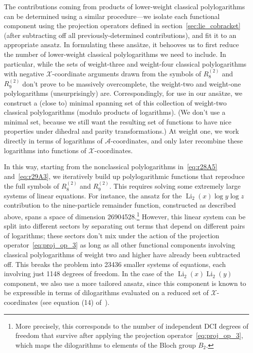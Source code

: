 \documentclass[11pt]{article}
\DeclareMathOperator{\Li}{Li}
\def\x{\mathcal{X}}
\def\a{\mathcal{A}}
\begin{document}
The contributions coming from products of lower-weight classical polylogarithms can be determined using a similar procedure---we isolate each functional component using the projection operators defined in section~\ref{sec:lie_cobracket} (after subtracting off all previously-determined contributions), and fit it to an appropriate ansatz. In formulating these ans\"atze, it behooves us to first reduce the number of lower-weight classical polylogarithms we need to include. In particular, while the sets of weight-three and weight-four classical polylogarithms with negative $\x$-coordinate arguments drawn from the symbols of $R_8^{(2)}$\! and $R_9^{(2)}$\! don't prove to be massively overcomplete, the weight-two and weight-one polylogarithms (unsurprisingly) are. Correspondingly, for use in our ans\"atze, we construct a (close to) minimal spanning set of this collection of weight-two classical polylogarithms (modulo products of logarithms). (We don't use a minimal set, because we still want the resulting set of functions to have nice properties under dihedral and parity transformations.) At weight one, we work directly in terms of logarithms of $\a$-coordinates, and only later recombine these logarithms into functions of $\x$-coordinates.  

In this way, starting from the nonclassical polylogarithms in~\eqref{eq:r28A5} and~\eqref{eq:r29A3}, we iteratively build up polylogarithmic functions that reproduce the full symbols of $R_8^{(2)}$\! and $R_9^{(2)}$\!. This requires solving some extremely large systems of linear equations. For instance, the ansatz for the $\Li_2(x) \log y  \log z$ contribution to the nine-particle remainder function, constructed as described above, spans a space of dimension 26904528.\footnote{More precisely, this corresponds to the number of independent DCI degrees of freedom that survive after applying the projection operator~\eqref{eq:proj_op_3}, which maps the dilogarithms to elements of the Bloch group $B_2$.} However, this linear system can be split into different sectors by separating out terms that depend on different pairs of logarithms; these sectors don't mix under the action of the projection operator~\eqref{eq:proj_op_3} as long as all other functional components involving classical polylogarithms of weight two and higher have already been subtracted off. This breaks the problem into 23436 smaller systems of equations, each involving just 1148 degrees of freedom. In the case of the $\Li_2(x) \Li_2(y)$ component, we also use a more tailored ansatz, since this component is known to be expressible in terms of dilogarithms evaluated on a reduced set of $\x$-coordinates (see equation (14) of~\cite{Golden:2014pua}).
\end{document}
